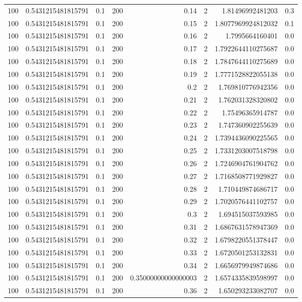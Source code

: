 \documentclass[11pt]{article}
\begin{document}
\begin{center}
\begin{tabular}{rrrrrrrr}
100 & 0.5431215481815791 & 0.1 & 200 & 0.14 & 2 & 1.81496992481203 & 0.3\\
100 & 0.5431215481815791 & 0.1 & 200 & 0.15 & 2 & 1.8077969924812032 & 0.1\\
100 & 0.5431215481815791 & 0.1 & 200 & 0.16 & 2 & 1.7995664160401 & 0.0\\
100 & 0.5431215481815791 & 0.1 & 200 & 0.17 & 2 & 1.7922644110275687 & 0.0\\
100 & 0.5431215481815791 & 0.1 & 200 & 0.18 & 2 & 1.7847644110275689 & 0.0\\
100 & 0.5431215481815791 & 0.1 & 200 & 0.19 & 2 & 1.7771528822055138 & 0.0\\
100 & 0.5431215481815791 & 0.1 & 200 & 0.2 & 2 & 1.769810776942356 & 0.0\\
100 & 0.5431215481815791 & 0.1 & 200 & 0.21 & 2 & 1.762031328320802 & 0.0\\
100 & 0.5431215481815791 & 0.1 & 200 & 0.22 & 2 & 1.75496365914787 & 0.0\\
100 & 0.5431215481815791 & 0.1 & 200 & 0.23 & 2 & 1.747360902255639 & 0.0\\
100 & 0.5431215481815791 & 0.1 & 200 & 0.24 & 2 & 1.7394436090225565 & 0.0\\
100 & 0.5431215481815791 & 0.1 & 200 & 0.25 & 2 & 1.7331203007518798 & 0.0\\
100 & 0.5431215481815791 & 0.1 & 200 & 0.26 & 2 & 1.7246904761904762 & 0.0\\
100 & 0.5431215481815791 & 0.1 & 200 & 0.27 & 2 & 1.7168508771929827 & 0.0\\
100 & 0.5431215481815791 & 0.1 & 200 & 0.28 & 2 & 1.710449874686717 & 0.0\\
100 & 0.5431215481815791 & 0.1 & 200 & 0.29 & 2 & 1.7020576441102757 & 0.0\\
100 & 0.5431215481815791 & 0.1 & 200 & 0.3 & 2 & 1.694515037593985 & 0.0\\
100 & 0.5431215481815791 & 0.1 & 200 & 0.31 & 2 & 1.6867631578947369 & 0.0\\
100 & 0.5431215481815791 & 0.1 & 200 & 0.32 & 2 & 1.6798220551378447 & 0.0\\
100 & 0.5431215481815791 & 0.1 & 200 & 0.33 & 2 & 1.6720501253132831 & 0.0\\
100 & 0.5431215481815791 & 0.1 & 200 & 0.34 & 2 & 1.6656979949874686 & 0.0\\
100 & 0.5431215481815791 & 0.1 & 200 & 0.35000000000000003 & 2 & 1.6574335839598997 & 0.0\\
100 & 0.5431215481815791 & 0.1 & 200 & 0.36 & 2 & 1.650293233082707 & 0.0\\

\end{tabular}
\end{center}
\end{document}
